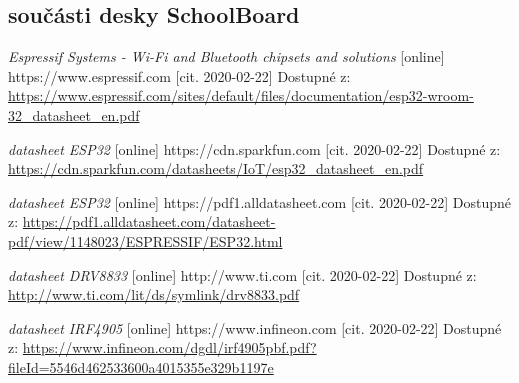 \documentclass{template/socthesis}
\begin{document}
\begin{thebibliography}{1}
			\subsection*{součásti desky SchoolBoard}
			
			
			\textit{Espressif Systems - Wi-Fi and Bluetooth chipsets and solutions } [online] https://www.espressif.com [cit. 2020-02-22] Dostupné z:
			\url{https://www.espressif.com/sites/default/files/documentation/esp32-wroom-32_datasheet_en.pdf}
			
			\textit{datasheet ESP32} [online] https://cdn.sparkfun.com [cit. 2020-02-22] Dostupné z:
			\url{https://cdn.sparkfun.com/datasheets/IoT/esp32_datasheet_en.pdf}
			
			\textit{datasheet ESP32} [online] https://pdf1.alldatasheet.com [cit. 2020-02-22] Dostupné z:
			\url{https://pdf1.alldatasheet.com/datasheet-pdf/view/1148023/ESPRESSIF/ESP32.html}
			
			
			\textit{datasheet DRV8833} [online] http://www.ti.com [cit. 2020-02-22] Dostupné z:
			\url{http://www.ti.com/lit/ds/symlink/drv8833.pdf}
			
			
			\textit{datasheet IRF4905} [online] https://www.infineon.com [cit. 2020-02-22] Dostupné z:
			\url{https://www.infineon.com/dgdl/irf4905pbf.pdf?fileId=5546d462533600a4015355e329b1197e}
			
			

\end{thebibliography}
\end{document}
